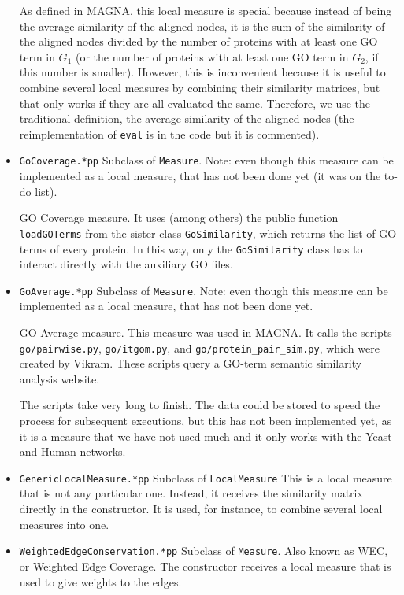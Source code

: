 \documentclass[]{article}
\begin{document}
\begin{itemize}
As defined in MAGNA, this local measure is special because instead of being the average similarity of the aligned nodes, it is the sum of the similarity of the aligned nodes divided by the number of proteins with at least one GO term in $G_1$ (or the number of proteins with at least one GO term in $G_2$, if this number is smaller). However, this is inconvenient because it is useful to combine several local measures by combining their similarity matrices, but that only works if they are all evaluated the same. Therefore, we use the traditional definition, the average similarity of the aligned nodes (the reimplementation of \texttt{eval} is in the code but it is commented).

\item \texttt{GoCoverage.*pp} Subclass of \texttt{Measure}. Note: even though this measure can be implemented as a local measure, that has not been done yet (it was on the to-do list).

GO Coverage measure. It uses (among others) the public function \texttt{loadGOTerms} from the sister class \texttt{GoSimilarity}, which returns the list of GO terms of every protein. In this way, only the \texttt{GoSimilarity} class has to interact directly with the auxiliary GO files.

\item \texttt{GoAverage.*pp} Subclass of \texttt{Measure}. Note: even though this measure can be implemented as a local measure, that has not been done yet.

GO Average measure. This measure was used in MAGNA. It calls the scripts \texttt{go/pairwise.py}, \texttt{go/itgom.py}, and \texttt{go/protein\_pair\_sim.py}, which were created by Vikram. These scripts query a GO-term semantic similarity analysis website.

The scripts take very long to finish. The data could be stored to speed the process for subsequent executions, but this has not been implemented yet, as it is a measure that we have not used much and it only works with the Yeast and Human networks.

\item \texttt{GenericLocalMeasure.*pp} Subclass of \texttt{LocalMeasure} This is a local measure that is not any particular one. Instead, it receives the similarity matrix directly in the constructor. It is used, for instance, to combine several local measures into one.

\item \texttt{WeightedEdgeConservation.*pp} Subclass of \texttt{Measure}. Also known as WEC, or Weighted Edge Coverage. The constructor receives a local measure that is used to give weights to the edges.


\end{itemize}
\end{document}

